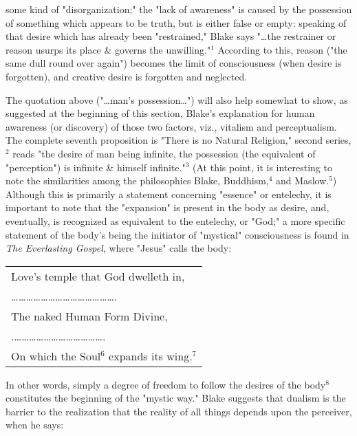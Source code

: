 \noindent some kind of "disorganization;" the "lack of awareness" is
caused by the possession of something which appears to be truth, but is either false or empty: speaking of that desire which has already been "restrained," Blake
says "\dots the restrainer or reason usurps its place \& governs the unwilling."$^{1}$ According to this, reason ("the same dull round over again") becomes the limit of consciousness
(when desire is forgotten), and creative desire is forgotten and neglected.\par
\vspace*{0.5\baselineskip}
The quotation above ("\dots man's possession\dots") will also help somewhat to show, as suggested at the beginning of this section, Blake's
explanation for human awareness (or discovery) of those two factors, viz., vitalism and perceptualism. The complete seventh proposition is "There is no Natural Religion," second
series,$^{2}$ reads "the desire of man being infinite, the possession (the equivalent of "perception") is infinite \& himself infinite."$^{3}$ (At this point, it is interesting to note the similarities among the philosophies
Blake, Buddhism,$^{4}$ and Maslow.$^{5}$) Although this is primarily a statement concerning "essence" or entelechy, it is important to note
that the "expansion" is present in the body as desire, and, eventually, is recognized as equivalent to the entelechy, or "God;" a more specific
statement of the body's being the initiator of "mystical" consciousness is found in \textit{The Everlasting Gospel}, where "Jesus" calls the body:\par
\begin{center}
	\parbox{0.8\textwidth}{
		\centering
		\begin{tabular}{l}
			Love's temple that God dwelleth in,                                     \\
			\dots\dots\dots\dots\dots\dots\dots\dots\dots\dots\dots\dots\dots\dots. \\
			The naked Human Form Divine,                                            \\
			.\dots\dots\dots\dots\dots\dots\dots\dots\dots\dots\dots\dots.          \\
			On which the Soul$^{6}$ expands its wing.$^{7}$
		\end{tabular}
	}%
\end{center}
\hspace*{5mm}In other words, simply a degree of freedom to follow the desires of the body$^{8}$ constitutes the beginning of the "mystic way."
Blake suggests that dualism is the barrier to the realization that the reality of all things depends upon the perceiver, when he says:\par
\vspace*{0.5\baselineskip}


